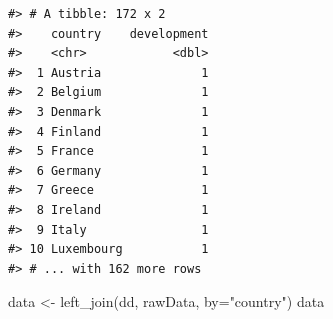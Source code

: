 \documentclass[
  11pt,
  a4paper,
  twoside]{scrbook}
\newenvironment{Shaded}{\begin{snugshade}}{\end{snugshade}}
\newcommand{\AttributeTok}[1]{\textcolor[rgb]{0.77,0.63,0.00}{#1}}
\newcommand{\DecValTok}[1]{\textcolor[rgb]{0.00,0.00,0.81}{#1}}
\newcommand{\FloatTok}[1]{\textcolor[rgb]{0.00,0.00,0.81}{#1}}
\newcommand{\FunctionTok}[1]{\textcolor[rgb]{0.00,0.00,0.00}{#1}}
\newcommand{\NormalTok}[1]{#1}
\newcommand{\OtherTok}[1]{\textcolor[rgb]{0.56,0.35,0.01}{#1}}
\newcommand{\SpecialCharTok}[1]{\textcolor[rgb]{0.00,0.00,0.00}{#1}}
\newcommand{\StringTok}[1]{\textcolor[rgb]{0.31,0.60,0.02}{#1}}
\begin{document}
\begin{Shaded}
\end{Shaded}

\linespread{1}

\begin{verbatim}
#> # A tibble: 172 x 2
#>    country    development
#>    <chr>            <dbl>
#>  1 Austria              1
#>  2 Belgium              1
#>  3 Denmark              1
#>  4 Finland              1
#>  5 France               1
#>  6 Germany              1
#>  7 Greece               1
#>  8 Ireland              1
#>  9 Italy                1
#> 10 Luxembourg           1
#> # ... with 162 more rows
\end{verbatim}

\linespread{1}

\begin{Shaded}
\begin{Highlighting}[]

\NormalTok{data }\OtherTok{\textless{}{-}} \FunctionTok{left\_join}\NormalTok{(dd, rawData, }\AttributeTok{by=}\StringTok{"country"}\NormalTok{)}
\NormalTok{data}
\end{Highlighting}
\end{Shaded}
\end{document}
